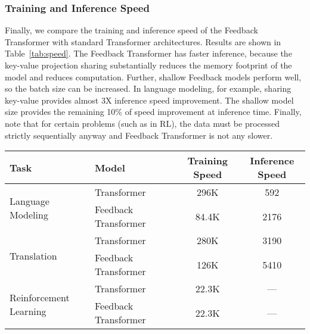 \documentclass{article} \usepackage{iclr2021_conference}
\begin{document}
\subsubsection{Training and Inference Speed}

Finally, we compare the training and inference speed of the Feedback Transformer with standard Transformer architectures. Results are shown in Table~\ref{tab:speed}. The Feedback Transformer has faster inference, because the key-value projection sharing substantially reduces the memory footprint of the model and reduces computation. Further, shallow Feedback models perform well, so the batch size can be increased. In language modeling, for example, sharing key-value provides almost 3X inference speed improvement. The shallow model size provides the remaining 10\% of speed improvement at inference time. Finally, note that for certain problems (such as in RL), the data must be processed strictly sequentially anyway and Feedback Transformer is not any slower.
\begin{table*}
\centering
		    \begin{tabular}{lllcc}
		    \toprule
		    Task & Model && Training Speed & Inference Speed \\
		    \midrule
		    \multirow{2}{*}{Language Modeling} & Transformer && 296K & 592 \\ 
		    & Feedback Transformer && 84.4K & 2176 \\ 
		    \midrule 
		    \multirow{2}{*}{Translation} & Transformer && 280K & 3190 \\ 
		    & Feedback Transformer && 126K & 5410 \\ 		    
	       	\midrule
		    \multirow{2}{*}{Reinforcement Learning} & Transformer &&22.3K & --- \\ 
		    & Feedback Transformer && 22.3K & ---\\ 
		    \bottomrule
		    \end{tabular}
		    \caption{
		    \textbf{Results comparing Training and Inference Speed} for three different tasks. For language modeling, we measure words-per-second on Wikitext-103 fixing model size and attention span. For translation, we measure words-per-second on WMT En-De, both models with a 6 layer encoder and 2 layer decoder. For RL, we measure the training frame-per-second on maze navigation (with 20 CPU cores and 1 GPU). All inference speed is reported on 1 GPU. 
		    }
		    \label{tab:speed}
\end{table*}
\end{document}
